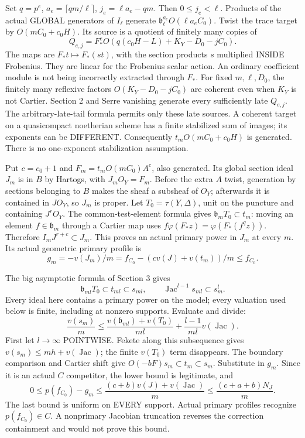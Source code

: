 \documentclass[11pt]{article}
\begin{document}
Set \(q=p^e\), \(a_e=\lceil qm/\ell\rceil\), \(j_e=\ell a_e-qm\). Then \(0\le j_e<\ell\). Products of the actual GLOBAL generators of \(I_\ell\) generate \(\mathfrak b_\ell^{a_e}O(\ell a_e C_0)\). Twist the trace target by \(O(mC_0+c_0H)\). Its source is a quotient of finitely many copies of
\[
Q_{e,j}=F_*^e O(q(c_0H-L)+K_Y-D_0-jC_0).
\]
The maps are \(F_*t\mapsto F_*(st)\), with the section products \(s\) multiplied INSIDE Frobenius. They are linear for the Frobenius scalar action. An ordinary coefficient module is not being incorrectly extracted through \(F_*\). For fixed \(m,\ell,D_0\), the finitely many reflexive factors \(O(K_Y-D_0-jC_0)\) are coherent even when \(K_Y\) is not Cartier. Section 2 and Serre vanishing generate every sufficiently late \(Q_{e,j}\). The arbitrary-late-tail formula permits only these late sources. A coherent target on a quasicompact noetherian scheme has a finite stabilized sum of images; its exponents can be DIFFERENT. Consequently \(t_mO(mC_0+c_0H)\) is generated. There is no one-exponent stabilization assumption.

Put \(c=c_0+1\) and \(F_m=t_mO(mC_0)A^c\), also generated. Its global section ideal \(J_m\) is in \(B\) by Hartogs, with \(J_mO_Y=F_m\). Before the extra \(A\) twist, generation by sections belonging to \(B\) makes the sheaf a subsheaf of \(O_Y\); afterwards it is contained in \(JO_Y\), so \(J_m\) is proper. Let \(T_0=\tau(Y,\Delta)\), unit on the puncture and containing \(J^rO_Y\). The common-test-element formula gives \(\mathfrak b_mT_0\subset t_m\): moving an element \(f\in\mathfrak b_m\) through a Cartier map uses \(f\varphi(F_*z)=\varphi(F_*(f^qz))\). Therefore \(I_mJ^{r+c}\subset J_m\). This proves an actual primary power in \(J_m\) at every \(m\). Its actual geometric primary profile is
\[
g_m=-v(J_m)/m=f_{C_0}-(c v(J)+v(t_m))/m\le f_{C_0}.
\]

The big asymptotic formula of Section 3 gives
\[
\mathfrak b_{ml}T_0\subset t_{ml}\subset s_{ml},
\qquad \operatorname{Jac}^{l-1}s_{ml}\subset s_m^l.
\]
Every ideal here contains a primary power on the model; every valuation used below is finite, including at nonzero supports. Evaluate and divide:
\[
\frac{v(s_m)}m\le
\frac{v(\mathfrak b_{ml})+v(T_0)}{ml}
+\frac{l-1}{ml}v(\operatorname{Jac}).
\]
First let \(l\to\infty\) POINTWISE. Fekete along this subsequence gives \(v(s_m)\le mh+v(\operatorname{Jac})\); the finite \(v(T_0)\) term disappears. The boundary comparison and Cartier shift give \(O(-bF)s_m\subset t_m\subset s_m\). Substitute in \(g_m\). Since it is an actual \(C\) competitor, the lower bound is legitimate, and
\[
0\le p(f_{C_0})-g_m
\le\frac{(c+b)v(J)+v(\operatorname{Jac})}{m}
\le\frac{(c+a+b)N_J}{m}.
\]
The last bound is uniform on EVERY support. Actual primary profiles recognize \(p(f_{C_0})\in C\). A nonprimary Jacobian truncation reverses the correction containment and would not prove this bound.
\end{document}
